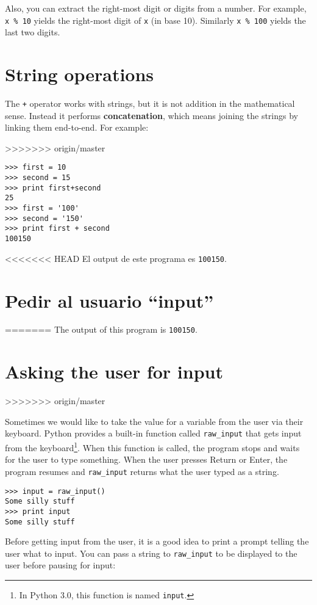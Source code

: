 \begin{ex}

Also, you can extract the right-most digit
or digits from a number.  For example, {\tt x \% 10} yields the
right-most digit of {\tt x} (in base 10).  Similarly {\tt x \% 100}
yields the last two digits.



\section{String operations}

The {\tt +} operator works with strings, but it
is not addition in the mathematical sense. Instead it performs
{\bf concatenation}, which means joining the strings by
linking them end-to-end.  For example:

>>>>>>> origin/master

\beforeverb
\begin{verbatim}
>>> first = 10
>>> second = 15
>>> print first+second
25
>>> first = '100'
>>> second = '150'
>>> print first + second
100150
\end{verbatim}
\afterverb
%
<<<<<<< HEAD
El output de este programa es {\tt 100150}.

\section{Pedir al usuario ``input''}
=======
The output of this program is {\tt 100150}.

\section{Asking the user for input}
>>>>>>> origin/master

Sometimes we would like to take the value for a variable from the user
via their keyboard.
Python provides a built-in function called \verb"raw_input" that gets
input from the keyboard\footnote{In Python 3.0, this function is named
  {\tt input}.}.  When this function is called, the program stops and
waits for the user to type something.  When the user presses {\sf
  Return} or {\sf Enter}, the program resumes and \verb"raw_input"
returns what the user typed as a string.


\beforeverb
\begin{verbatim}
>>> input = raw_input()
Some silly stuff
>>> print input
Some silly stuff
\end{verbatim}
\afterverb
%
Before getting input from the user, it is a good idea to print a
prompt telling the user what to input.  You can pass a string
to \verb"raw_input" to be displayed to the user before pausing
for input:


\end{ex}
